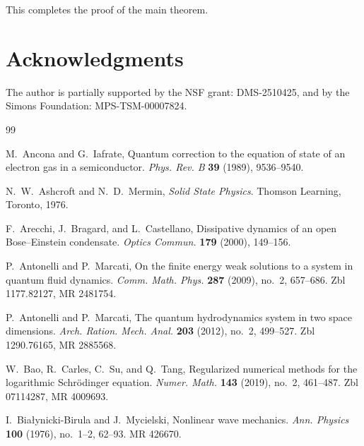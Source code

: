 \documentclass[11pt]{article}
\begin{document}
This completes the proof of the main theorem.










 
  \section*{Acknowledgments}

The author  is partially supported
by the NSF grant: DMS-2510425, and by the Simons Foundation: MPS-TSM-00007824.







\begin{thebibliography}{99}

M.~Ancona and G.~Iafrate,
\newblock Quantum correction to the equation of state of an electron gas in a semiconductor.
\newblock \emph{Phys. Rev. B} \textbf{39} (1989), 9536--9540.

N.~W.~Ashcroft and N.~D.~Mermin,
\newblock \emph{Solid State Physics}.
\newblock Thomson Learning, Toronto, 1976.

F.~Arecchi, J.~Bragard, and L.~Castellano,
\newblock Dissipative dynamics of an open Bose--Einstein condensate.
\newblock \emph{Optics Commun.} \textbf{179} (2000), 149--156.

P.~Antonelli and P.~Marcati,
\newblock On the finite energy weak solutions to a system in quantum fluid dynamics.
\newblock \emph{Comm. Math. Phys.} \textbf{287} (2009), no.~2, 657--686.
\newblock Zbl 1177.82127, MR 2481754.

P.~Antonelli and P.~Marcati,
\newblock The quantum hydrodynamics system in two space dimensions.
\newblock \emph{Arch. Ration. Mech. Anal.} \textbf{203} (2012), no.~2, 499--527.
\newblock Zbl 1290.76165, MR 2885568.

W.~Bao, R.~Carles, C.~Su, and Q.~Tang,
\newblock Regularized numerical methods for the logarithmic Schr\"odinger equation.
\newblock \emph{Numer. Math.} \textbf{143} (2019), no.~2, 461--487.
\newblock Zbl 07114287, MR 4009693.

I.~Bia{\l}ynicki-Birula and J.~Mycielski,
\newblock Nonlinear wave mechanics.
\newblock \emph{Ann. Physics} \textbf{100} (1976), no.~1--2, 62--93.
\newblock MR 426670.





\end{thebibliography}
\end{document}

